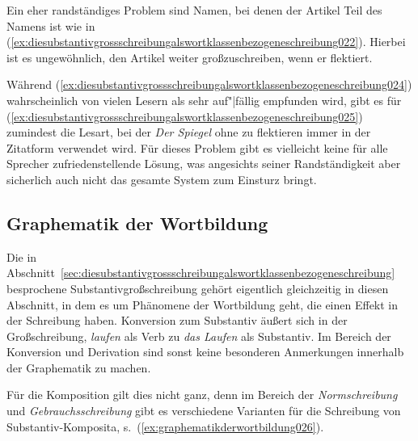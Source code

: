 Ein eher randständiges Problem sind Namen, bei denen der Artikel Teil des Namens ist wie in (\ref{ex:diesubstantivgrossschreibungalswortklassenbezogeneschreibung022}).
Hierbei ist es ungewöhnlich, den Artikel weiter großzuschreiben, wenn er flektiert.


\begin{exe}
  \ex\label{ex:diesubstantivgrossschreibungalswortklassenbezogeneschreibung023}
  \begin{xlist}
  \end{xlist}
\end{exe}


Während (\ref{ex:diesubstantivgrossschreibungalswortklassenbezogeneschreibung024}) wahrscheinlich von vielen Lesern als sehr auf"|fällig empfunden wird, gibt es für (\ref{ex:diesubstantivgrossschreibungalswortklassenbezogeneschreibung025}) zumindest die Lesart, bei der \textit{Der Spiegel} ohne zu flektieren immer in der Zitatform verwendet wird.
Für dieses Problem gibt es vielleicht keine für alle Sprecher zufriedenstellende Lösung, was angesichts seiner Randständigkeit aber sicherlich auch nicht das gesamte System zum Einsturz bringt.


\subsection{Graphematik der Wortbildung}
\label{sec:graphematikderwortbildung}

Die in Abschnitt~\ref{sec:diesubstantivgrossschreibungalswortklassenbezogeneschreibung} besprochene Substantivgroßschreibung gehört eigentlich gleichzeitig in diesen Abschnitt, in dem es um Phänomene der Wortbildung geht, die einen Effekt in der Schreibung haben.
Konversion zum Substantiv äußert sich in der Großschreibung, \zB \textit{laufen} als Verb zu \textit{das Laufen} als Substantiv.
Im Bereich der Konversion und Derivation sind sonst keine besonderen Anmerkungen innerhalb der Graphematik zu machen.

Für die Komposition gilt dies nicht ganz, denn im Bereich der \textit{Normschreibung} und \textit{Gebrauchsschreibung} gibt es verschiedene Varianten für die Schreibung von Substantiv-Komposita, s.\ (\ref{ex:graphematikderwortbildung026}).


\begin{exe}
  \ex\label{ex:graphematikderwortbildung026}
  \begin{xlist}
  \end{xlist}
\end{exe}


